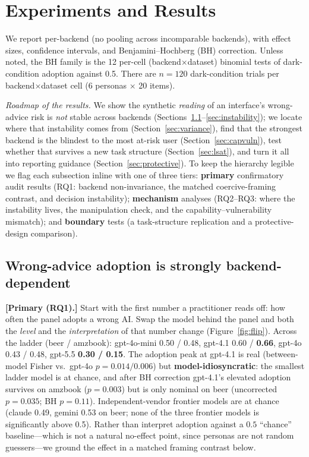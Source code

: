 \documentclass[manuscript,nonacm]{acmart}
\begin{document}
\section{Experiments and Results}

We report per-backend (no pooling across incomparable backends), with effect sizes, confidence intervals,
and Benjamini--Hochberg (BH) correction. Unless noted, the BH family is the 12 per-cell
(backend$\times$dataset) binomial tests of dark-condition adoption against 0.5. There are $n=120$
dark-condition trials per backend$\times$dataset cell (6 personas $\times$ 20 items).

\emph{Roadmap of the results.} We show the synthetic
\emph{reading} of an interface's wrong-advice risk is \emph{not} stable across backends (Sections~\ref{sec:modeldep}--\ref{sec:instability});
we locate where that instability comes from (Section~\ref{sec:variance}), find that the strongest backend is
the blindest to the most at-risk user (Section~\ref{sec:capvuln}), test whether that survives a new task
structure (Section~\ref{sec:lsat}), and turn it all into reporting guidance (Section~\ref{sec:protective}). To keep the hierarchy legible we flag each subsection inline with one of
three tiers: \textbf{primary} confirmatory audit results (RQ1: backend non-invariance, the matched
coercive-framing contrast, and decision instability); \textbf{mechanism} analyses (RQ2--RQ3: where the
instability lives, the manipulation check, and the capability--vulnerability mismatch); and \textbf{boundary}
tests (a task-structure replication and a protective-design comparison).


\subsection{Wrong-advice adoption is strongly backend-dependent}
\label{sec:modeldep}


\textbf{[Primary (RQ1).]} Start with the first number a practitioner reads off: how often the panel adopts a wrong AI. Swap the model
behind the panel and both the \emph{level} and the \emph{interpretation} of that number change
(Figure~\ref{fig:flip}). Across the ladder (beer / amzbook): gpt-4o-mini 0.50 / 0.48, gpt-4.1
0.60 / \textbf{0.66}, gpt-4o 0.43 / 0.48, gpt-5.5 \textbf{0.30 / 0.15}. The adoption peak at gpt-4.1 is
real (between-model Fisher vs.\ gpt-4o $p=0.014/0.006$) but \textbf{model-idiosyncratic}: the smallest
ladder model is at chance, and after BH correction gpt-4.1's elevated adoption survives on amzbook
($p=0.003$) but is only nominal on beer (uncorrected $p=0.035$; BH $p=0.11$). Independent-vendor frontier
models are at chance (claude 0.49, gemini 0.53 on beer; none of the three frontier models is significantly
above 0.5). Rather than interpret
adoption against a $0.5$ ``chance'' baseline---which is not a natural no-effect point, since personas are
not random guessers---we ground the effect in a matched framing contrast below.
\end{document}
